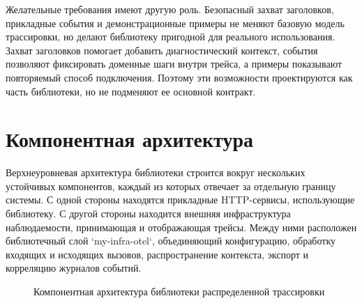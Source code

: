 Желательные требования имеют другую роль. Безопасный захват заголовков,
прикладные события и демонстрационные примеры не меняют базовую модель
трассировки, но делают библиотеку пригодной для реального использования. Захват
заголовков помогает добавить диагностический контекст, события позволяют
фиксировать доменные шаги внутри трейса, а примеры показывают повторяемый способ
подключения. Поэтому эти возможности проектируются как часть библиотеки, но не
подменяют ее основной контракт.

\section{Компонентная архитектура}

Верхнеуровневая архитектура библиотеки строится вокруг нескольких устойчивых
компонентов, каждый из которых отвечает за отдельную границу системы. С одной
стороны находятся прикладные HTTP-сервисы, использующие библиотеку. С другой
стороны находится внешняя инфраструктура наблюдаемости, принимающая и отображающая
трейсы. Между ними расположен библиотечный слой `my-infra-otel`, объединяющий
конфигурацию, обработку входящих и исходящих вызовов, распространение контекста,
экспорт и корреляцию журналов событий.

\begin{figure}[H]
    \centering
    \caption{Компонентная архитектура библиотеки распределенной трассировки}
    \label{fig:component-architecture}
\end{figure}

